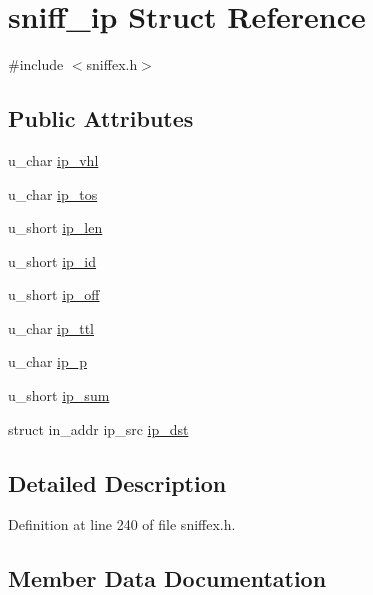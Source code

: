 \hypertarget{structsniff__ip}{}\section{sniff\+\_\+ip Struct Reference}
\label{structsniff__ip}


{\ttfamily \#include $<$sniffex.\+h$>$}

\subsection*{Public Attributes}
\begin{DoxyCompactItemize}
\item 
u\+\_\+char \hyperlink{structsniff__ip_a8ced3d6237cb8b0538e73227843b4edb}{ip\+\_\+vhl}
\item 
u\+\_\+char \hyperlink{structsniff__ip_aa850a52985272f13d6866d14be1ecdf6}{ip\+\_\+tos}
\item 
u\+\_\+short \hyperlink{structsniff__ip_aa4907e31555a52a20bc0eadc46d45044}{ip\+\_\+len}
\item 
u\+\_\+short \hyperlink{structsniff__ip_a9cae00d3f7491ce2bfcb086880b1aa6a}{ip\+\_\+id}
\item 
u\+\_\+short \hyperlink{structsniff__ip_aecf13449d60d1e0b7d78a64fcd3e54de}{ip\+\_\+off}
\item 
u\+\_\+char \hyperlink{structsniff__ip_abed391544944e353d09e85030f423ec8}{ip\+\_\+ttl}
\item 
u\+\_\+char \hyperlink{structsniff__ip_a49d22326de644e4d1158ef7ae4fb22b7}{ip\+\_\+p}
\item 
u\+\_\+short \hyperlink{structsniff__ip_a263384b09865cda4a03e3451de740c84}{ip\+\_\+sum}
\item 
struct in\+\_\+addr ip\+\_\+src \hyperlink{structsniff__ip_ad2db4a1d3fbfb1bcc44e5a26d6c28c2e}{ip\+\_\+dst}
\end{DoxyCompactItemize}


\subsection{Detailed Description}


Definition at line 240 of file sniffex.\+h.



\subsection{Member Data Documentation}
